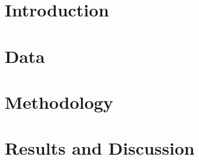 \documentclass[clean,twocolumn]{bam-project}
\begin{document}
\makebamtitle

\begin{BAMabstract}

\end{BAMabstract}

\section{Introduction}
\label{sec:introduction}




\section{Data}
\label{sec:data}


\section{Methodology}
\label{sec:methodology}






\section{Results and Discussion}
\label{sec:results}










\end{document}
